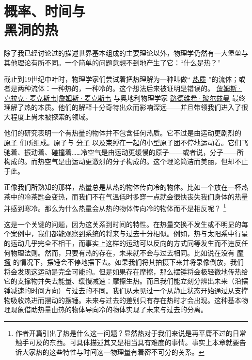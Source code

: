 	\chapter{概率、时间与\\黑洞的热}
\indent

    除了我已经讨论过的描述世界基本组成的主要理论以外，物理学仍然有一大堡垒与其他理论有所不同。一个简单的问题意想不到地产生了它：“什么是热？”

    截止到19世纪中叶时，物理学家们尝试着把热理解为一种叫做“
\href{http://toyhouse.cc/wiki/index.php/热质}{热质}
”的流体；或者是两种流体：一种热的，一种冷的。这个想法后来被证明是错误的。
\href{http://toyhouse.cc/wiki/index.php/詹姆斯·克拉克·麦克斯韦|詹姆斯·麦克斯韦}{詹姆斯·克拉克·麦克斯韦|詹姆斯·麦克斯韦}
与奥地利物理学家
\href{http://toyhouse.cc/wiki/index.php/路德维希·玻尔兹曼}{路德维希·玻尔兹曼}
最终理解了热的本质。他们的解释十分奇特出众而影响深远——并且带领我们进入了很大程度上尚未被探索的领域。

    他们的研究表明一个有热量的物体并不包含任何热质。它不过是由运动更剧烈的
\href{http://toyhouse.cc/wiki/index.php/原子}{原子}
们所组成。原子与
\href{http://toyhouse.cc/wiki/index.php/分子}{分子}
以及束缚在一起的小型原子团不停地运动着。它们飞驰着、振动着、碰撞着……冷空气是由运动更缓慢的原子——或者说，分子——所构成的。而热空气是由运动更激烈的分子构成的。这个理论简洁而美丽，但却不止于此。

    正像我们所熟知的那样，热量总是从热的物体传向冷的物体。比如一个放在一杯热茶中的冷茶匙会变热，而我们不在气温低时多穿一点就会很快丧失我们身体的热量并感到寒冷。那么为什么热量会从热的物体传向冷的物体而不是相反呢？
\footnote[1]
{
作者开篇引出了热是什么这一问题？显然热对于我们来说是再平庸不过的日常触手可及的东西。可具体描述其又是相当具有难度的事情。事实上本章就要告诉大家热的这些特性与时间这一物理量有着密不可分的关系。
}

    这是一个关键的问题，因为这关系到时间的特性。在热量交换不发生或不明显的每个案例中，我们都能观察到系统的将来与过去十分相似。例如，热与太阳系中行星的运动几乎完全不相干，而事实上这样的运动可以反向的方式同等发生而不违反任何物理法则。然而，只要有热的存在，未来就不会与过去相同。比如说在没有
\href{http://toyhouse.cc/wiki/index.php/摩擦}{摩擦}
的情况下，摆锤会不停地摆下去。如果我们将其拍摄下来并将录像倒放，我们将会发现这运动是完全可能的。但是如果存在摩擦，那么摆锤将会极轻微地传热给它的支撑物并失去能量、缓慢减速：摩擦生热。而且我们能立刻分辨出未来（沿摆锤减速的时间方向）与过去的不同。我们从未见过一个从静止状态开始通过从支撑物吸收热进而摆动的摆锤。未来与过去的差别只有存在热时才会出现。这种基本物理现象借助热量由热的物体导向冷的物体实现了未来与过去的分离。

